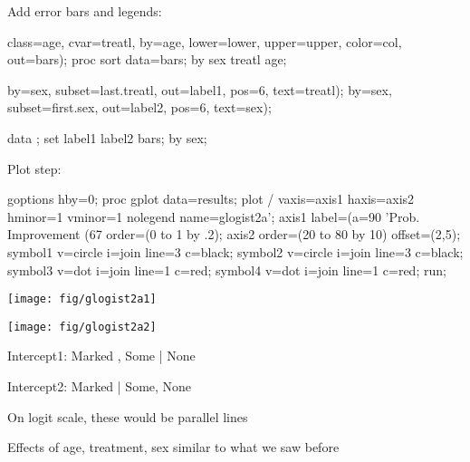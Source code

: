 \begin{frame}[fragile]
Add error bars and legends:
\vspace{2ex}
\begin{Input}[fontsize=\small,label=\fbox{$\cdots$ \texttt{glogist2a.sas} $\cdots$},baselinestretch=0.8,firstnumber=22]
   class=age, cvar=treatl, by=age,
   lower=lower, upper=upper, 
   color=col, out=bars);
proc sort data=bars;
   by sex treatl age;

   by=sex, subset=last.treatl, out=label1, pos=6, text=treatl);
   by=sex, subset=first.sex, out=label2, pos=6, text=sex);

data ;
   set label1 label2 bars;
   by sex;
\end{Input}
\end{frame}

\begin{frame}[fragile]
Plot step:
\begin{Input}[fontsize=\small,label=\fbox{$\cdots$ \texttt{glogist2a.sas}},baselinestretch=0.8,firstnumber=41]
goptions hby=0;
proc gplot data=results;
   plot  / 
       vaxis=axis1 haxis=axis2 hminor=1 vminor=1
       nolegend  name=glogist2a';
   axis1 label=(a=90 'Prob. Improvement (67%
         order=(0 to 1 by .2);
   axis2 order=(20 to 80 by 10)
         offset=(2,5);
   symbol1 v=circle  i=join line=3 c=black;
   symbol2 v=circle  i=join line=3 c=black;
   symbol3 v=dot     i=join line=1 c=red;
   symbol4 v=dot     i=join line=1 c=red;
run;
\end{Input}
\end{frame}

\begin{frame}
 \begin{minipage}[b]{.5\linewidth}
  \centering
  \texttt{[image: fig/glogist2a1]}
 \end{minipage}%
 \begin{minipage}[b]{.5\linewidth}
  \centering
  \texttt{[image: fig/glogist2a2]}
 \end{minipage}
\begin{itemize*}
  \item Intercept1: Marked , Some | None
  \item Intercept2: Marked | Some, None
  \item On logit scale, these would be parallel lines
  \item Effects of age, treatment, sex similar to what we saw before
\end{itemize*}
\end{frame}

